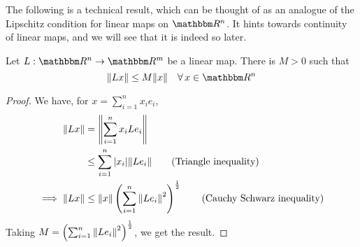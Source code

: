\documentclass[Analysis-3]{subfiles}
\begin{document}
The following is a technical result, which can be thought of as an analogue of the Lipschitz condition for linear maps on $ \R^n $. It hints towards continuity of linear maps, and we will see that it is indeed so later.
\ssk

\begin{Thm}{}{}
      Let $ L: \R^n \to \R^m $ be a linear map. There is $ M > 0 $ such that
      \[ \norm{Lx} \leq M \norm{x} \quad \forall \, x \in \R^n \]
\end{Thm}
\begin{proof}
      We have, for $ x = \sum_{i=1}^{n}x_ie_i $,
      \begin{align*}
            \norm{Lx}          & = \norm{\sum_{i=1}^{n} x_i Le_i}                                                                  \\
                               & \leq \sum_{i=1}^{n} |x_i| \norm{Le_i} \tag{Triangle inequality}                                   \\
            \implies \norm{Lx} & \leq \norm{x} \left(\sum_{i=1}^{n}\norm{Le_i}^2\right)^{\frac 12} \tag{Cauchy Schwarz inequality}
      \end{align*}
      Taking $ M = \left(\sum_{i=1}^{n}\norm{Le_i}^2\right)^{\frac 12} $, we get the result.
\end{proof}
\end{document}
